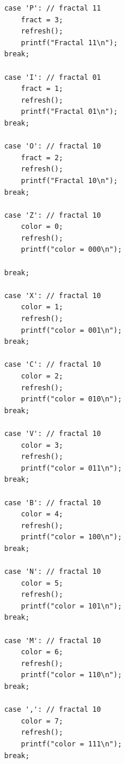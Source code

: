 \documentclass{article}
\begin{document}
\begin{lstlisting}
                    case 'P': // fractal 11
                        fract = 3;
                        refresh();
                        printf("Fractal 11\n");
                    break;
                    
                    case 'I': // fractal 01
                        fract = 1;
                        refresh();
                        printf("Fractal 01\n");
                    break;
                    
                    case 'O': // fractal 10
                        fract = 2;
                        refresh();
                        printf("Fractal 10\n");
                    break;
                    
                    case 'Z': // fractal 10
                        color = 0;
                        refresh();
                        printf("color = 000\n");

                    break;
                    
                    case 'X': // fractal 10
                        color = 1;
                        refresh();
                        printf("color = 001\n");
                    break;
                    
                    case 'C': // fractal 10
                        color = 2;
                        refresh();
                        printf("color = 010\n");
                    break;
                    
                    case 'V': // fractal 10
                        color = 3;
                        refresh();
                        printf("color = 011\n");
                    break;
                    
                    case 'B': // fractal 10
                        color = 4;
                        refresh();
                        printf("color = 100\n");
                    break;
                    
                    case 'N': // fractal 10
                        color = 5;
                        refresh();
                        printf("color = 101\n");
                    break;
                    
                    case 'M': // fractal 10
                        color = 6;
                        refresh();
                        printf("color = 110\n");
                    break;
                    
                    case ',': // fractal 10
                        color = 7;
                        refresh();
                        printf("color = 111\n");
                    break;
                    

\end{lstlisting}
\end{document}
